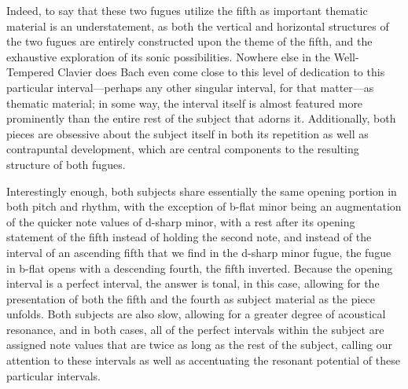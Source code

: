     \begin{center}
    \end{center}
    

    \begin{center}
    \end{center}
    
    Indeed, to say that these two fugues utilize the fifth as important
thematic material is an understatement, as both the vertical and
horizontal structures of the two fugues are entirely constructed upon
the theme of the fifth, and the exhaustive exploration of its sonic
possibilities. Nowhere else in the Well-Tempered Clavier does Bach even
come close to this level of dedication to this particular
interval---perhaps any other singular interval, for that
matter---as thematic material; in some way, the interval itself is
almost featured more prominently than the entire rest of the subject
that adorns it. Additionally, both pieces are obsessive about the
subject itself in both its repetition as well as contrapuntal
development, which are central components to the resulting structure of
both fugues.

Interestingly enough, both subjects share essentially the same opening
portion in both pitch and rhythm, with the exception of b-flat minor
being an augmentation of the quicker note values of d-sharp minor, with
a rest after its opening statement of the fifth instead of holding the
second note, and instead of the interval of an ascending fifth that we
find in the d-sharp minor fugue, the fugue in b-flat opens with a
descending fourth, the fifth inverted. Because the opening interval is a
perfect interval, the answer is tonal, in this case, allowing for the
presentation of both the fifth and the fourth as subject material as the
piece unfolds. Both subjects are also slow, allowing for a greater
degree of acoustical resonance, and in both cases, all of the perfect
intervals within the subject are assigned note values that are twice as
long as the rest of the subject, calling our attention to these
intervals as well as accentuating the resonant potential of these
particular intervals.

